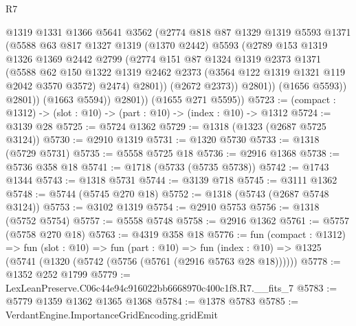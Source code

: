 \begin{lexlean}{R7}
\begin{coremodule}
                    @1319
                    @1331
                    @1366
                    @5641
                    @3562
                    (@2774
                      @818
                      @87
                      @1329
                      @1319
                      @5593
                      @1371
                      (@5588
                        @63
                        @817
                        @1327
                        @1319
                        (@1370 @2442)
                        @5593
                        (@2789
                          @153
                          @1319
                          @1326
                          @1369
                          @2442
                          @2799
                          (@2774
                            @151
                            @87
                            @1324
                            @1319
                            @2373
                            @1371
                            (@5588
                              @62
                              @150
                              @1322
                              @1319
                              @2462
                              @2373
                              (@3564 @122 @1319 @1321 @119 @2042 @3570 @3572)
                              @2474)
                            @2801))
                        (@2672 @2373))
                      @2801))
                  (@1656 @5593))
                @2801))
            (@1663 @5594))
          @2801))
      (@1655 @271 @5595))
@5723 := (compact : @1312) -> (slot : @10) -> (part : @10) -> (index : @10) -> @1312
@5724 := @3139 @28
@5725 := @5724 @1362
@5729 := @1318 (@1323 (@2687 @5725 @3124))
@5730 := @2910 @1319
@5731 := @1320 @5730
@5733 := @1318 (@5729 @5731)
@5735 := @5558 @5725 @18
@5736 := @2916 @1368
@5738 := @5736 @358 @18
@5741 := @1718 (@5733 (@5735 @5738))
@5742 := @1743 @1344
@5743 := @1318 @5731
@5744 := @3139 @718
@5745 := @3111 @1362
@5748 := @5744 (@5745 @270 @18)
@5752 := @1318 (@5743 (@2687 @5748 @3124))
@5753 := @3102 @1319
@5754 := @2910 @5753
@5756 := @1318 (@5752 @5754)
@5757 := @5558 @5748
@5758 := @2916 @1362
@5761 := @5757 (@5758 @270 @18)
@5763 := @4319 @358 @18
@5776 := fun (compact : @1312) =>
  fun (slot : @10) =>
  fun (part : @10) =>
  fun (index : @10) => @1325 (@5741 (@1320 (@5742 (@5756 (@5761 (@2916 @5763 @28 @18))))))
@5778 := @1352 @252 @1799
@5779 := LexLeanPreserve.C06c44e94c916022bb6668970c400c1f8.R7.__fits_7
@5783 := @5779 @1359 @1362 @1365 @1368
@5784 := @1378 @5783
@5785 := VerdantEngine.ImportanceGridEncoding.gridEmit

\end{coremodule}
\end{lexlean}
